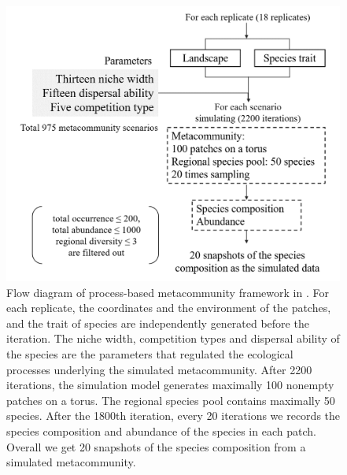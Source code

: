 \begin{figure}
	\centering
	\includegraphics[width=0.7\linewidth]{./figures/ppt/Thompson.png}
	\caption[Flow diagram of process-based metacommunity framework in \citet{thompson2020process}.]{\small
		Flow diagram of process-based metacommunity framework in \citet{thompson2020process}. For each replicate, the coordinates and the environment of the patches, and the trait of species are independently generated before the iteration. The niche width, competition types and dispersal ability of the species are the parameters that regulated the ecological processes underlying the simulated metacommunity. After 2200 iterations, the simulation model generates maximally 100 nonempty patches on a torus. The regional species pool contains maximally 50 species. After the 1800th iteration, every 20 iterations we records the species composition and abundance of the species in each patch. Overall we get 20 snapshots of the species composition from a simulated metacommunity.}
	\label{fig:thompson}
\end{figure}


